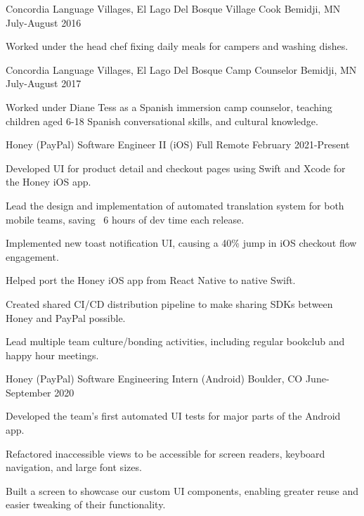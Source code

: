 \documentclass[12pt, a4paper]{awesome-cv}
\begin{document}
\begin{cventries}
\cventry
  {Concordia Language Villages, El Lago Del Bosque}
  {Village Cook}
  {Bemidji, MN}
  {July-August 2016}
  {
    \begin{cvitems}
      \item {Worked under the head chef fixing daily meals for campers and washing dishes.}
    \end{cvitems}
  }

  \cventry
    {Concordia Language Villages, El Lago Del Bosque}
    {Camp Counselor}
    {Bemidji, MN}
    {July-August 2017}
    {
      \begin{cvitems}
        \item {Worked under Diane Tess as a Spanish immersion camp counselor, teaching children aged 6-18 Spanish conversational skills, and cultural knowledge.}
      \end{cvitems}
    }

  \cventry
    {Honey (PayPal)}
    {Software Engineer II (iOS)}
    {Full Remote}
    {February 2021-Present}
    {
        \begin{cvitems}
            \item {Developed UI for product detail and checkout pages using Swift and Xcode for the Honey iOS app.}
            \item {Lead the design and implementation of automated translation system for both mobile teams, saving ~6 hours of dev time each release.}
            \item {Implemented new toast notification UI, causing a 40\% jump in iOS checkout flow engagement.}
            \item {Helped port the Honey iOS app from React Native to native Swift.}
            \item {Created shared CI/CD distribution pipeline to make sharing SDKs between Honey and PayPal possible.}
            \item {Lead multiple team culture/bonding activities, including regular bookclub and happy hour meetings.}
        \end{cvitems}
    }

  \cventry
    {Honey (PayPal)}
    {Software Engineering Intern (Android)}
    {Boulder, CO}
    {June-September 2020}
    {
        \begin{cvitems}
            \item {Developed the team's first automated UI tests for major parts of the Android app.}
            \item {Refactored inaccessible views to be accessible for screen readers, keyboard navigation, and large font sizes.}
            \item {Built a screen to showcase our custom UI components, enabling greater reuse and easier tweaking of their functionality.}
        \end{cvitems}
    }


\end{cventries}
\end{document}
